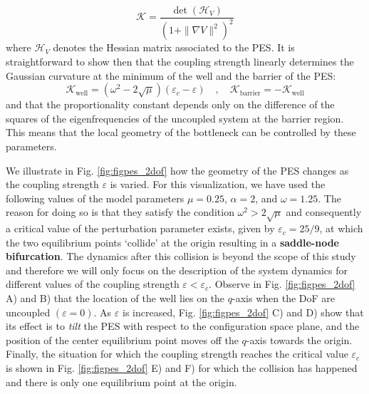 \documentclass[8pt]{article}
\begin{document}
\begin{equation}
\mathcal{K} = \dfrac{\det \left(\mathcal{H}_V\right)}{\left(1 + \| \nabla V \|^2\right)^2}
\end{equation}
where $\mathcal{H}_V$ denotes the Hessian matrix associated to the PES. It is straightforward to show then that the coupling strength linearly determines the Gaussian curvature at the minimum of the well and the barrier of the PES:
\begin{equation}
\mathcal{K}_{\text{well}} = \left(\omega^2 - 2\sqrt{\mu}\right) \left(\varepsilon_c - \varepsilon\right) \quad , \quad \mathcal{K}_{\text{barrier}} = -\mathcal{K}_{\text{well}}
\end{equation}
and that the proportionality constant depends only on the difference of the squares of the eigenfrequencies of the uncoupled system at the barrier region. This means that the local geometry of the bottleneck can be controlled by these parameters.

\smallskip

We illustrate in Fig. \ref{fig:figpes_2dof} how the geometry of the PES changes as the coupling strength $\varepsilon$ is varied. For this visualization, we have used the following values of the model parameters $\mu = 0.25$, $\alpha = 2$, and $\omega = 1.25$. The reason for doing so is that they satisfy the condition $\omega^2 > 2\sqrt{\mu}$ and consequently a critical value of the perturbation parameter exists, given by $\varepsilon_c = 25/9$, at which the two equilibrium points `collide' at the origin resulting in a \textbf{saddle-node bifurcation}. The dynamics after this collision is beyond the scope of this study and therefore we will only focus on the description of the system dynamics for different values of the coupling strength $\varepsilon < \varepsilon_c$. Observe in Fig. \ref{fig:figpes_2dof} A) and B) that the location of the well  lies on the $q$-axis when the DoF are uncoupled $(\varepsilon = 0)$. As $\varepsilon$ is increased, Fig. \ref{fig:figpes_2dof} C) and D) show that its effect is to \textit{tilt} the PES with respect to the configuration space plane, and the position of the center equilibrium point moves off the $q$-axis towards the origin. Finally, the situation for which the coupling strength reaches the critical value $\varepsilon_c$ is shown in Fig. \ref{fig:figpes_2dof} E) and F) for which the collision has happened and there is only one equilibrium point at the origin.
\end{document}
